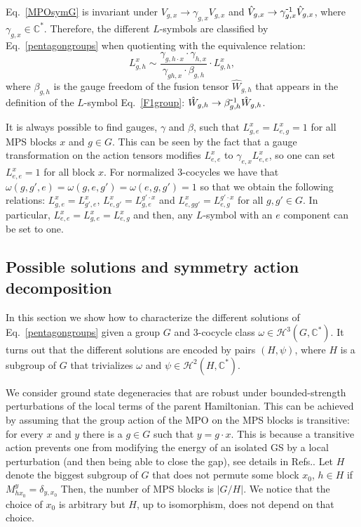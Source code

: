 \documentclass[a4paper,twocolumn,11pt,accepted=2023-02-10]{quantumarticle}
\newcommand{\myinv}[1]{#1^{\scalebox{0.9}[1.0]{-}1}}
\begin{document}
 Eq.\ \eqref{MPOsymG} is invariant under 
 $ V_{g,x} \to  \gamma_{g,x}  V_{g,x}$ and  $\hat{V}_{g,x} \to  \myinv{\gamma}_{g,x} \hat{V}_{g,x}$, where $ \gamma_{g,x}\in \mathbb{C}^*$. Therefore, the different ${L}$-symbols are classified by Eq.\ \eqref{pentagongroups} when quotienting with the equivalence relation:
 \begin{equation}\label{gdgroup}
{L}_{g,h}^{x} \sim  \frac{ \gamma_{g,h{\cdot} x} \cdot \gamma_{h,x} }{\gamma_{gh,x} \cdot \beta_{g,h} } \cdot {L}_{g,h}^{x}, 
 \end{equation}
where ${\beta}_{g,h}$ is the gauge freedom of the fusion tensor $\hat{W}_{g,h}$ that appears in the definition of the ${L}$-symbol Eq.\ \eqref{F1group}:
$\hat{W}_{g,h}\to \myinv{\beta}_{g,h} \hat{W}_{g,h}$. 

It is always possible to find gauges, $\gamma$ and $\beta$, such that ${L}_{g,e}^{x}={L}_{e,g}^{x}=1$ for all MPS blocks $x$ and $g \in G$. This can be seen by the fact that a gauge transformation on the action tensors modifies ${L}_{e,e}^{x}$ to $\gamma_{e,x} {L}_{e,e}^{x}$, so one can set ${L}_{e,e}^{x}=1$ for all block $x$. For normalized 3-cocycles we have that $\omega(g,g',e)= \omega(g,e,g')=\omega(e,g,g')=1$ so that we obtain the following relations: ${L}_{g,e}^{x} = {L}_{g',e}^{x}$, ${L}_{e,g'}^{x} = {L}_{g,e}^{g'{\cdot} x}$ and ${L}_{e,gg'}^{x} = {L}_{e,g}^{g'{\cdot} x}$ for all $g,g'\in G$. In particular, ${L}_{e,e}^{x}={L}_{g,e}^{x}={L}_{e,g}^{x}$ and then, any ${L}$-symbol with an $e$ component can be set to one.


\subsection{Possible solutions and symmetry action decomposition} \label{physym}
%

In this section we show how to characterize the different solutions of Eq.\ \eqref{pentagongroups} given a group $G$ and $3$-cocycle class $\omega \in  \mathcal{H}^3 (G,\mathbb{C}^*)$. It turns out that the different solutions are encoded by pairs $(H,\psi)$, where $H$ is a subgroup of $G$ that trivializes $\omega$ and $\psi \in \mathcal{H}^2(H,\mathbb{C}^*)$. 

We consider ground state degeneracies that are robust under bounded-strength perturbations of the local terms of the parent Hamiltonian. This can be achieved by assuming that the group action of the MPO on the MPS blocks is transitive: for every $x$ and $y$ there is a $g\in G$ such that $y=g {\cdot} x$. This is because a transitive action prevents one from modifying the energy of an isolated GS by a local perturbation (and then being able to close the gap), see details in Refs.\cite{Schuch11,Bravyi11}. Let $H$ denote the biggest subgroup of $G$ that does not permute some block $x_0$, $h\in H$ if $M_{h x_0}^y=\delta_{y,x_0}$ Then, the number of MPS blocks is $|G/H|$.  We notice that the choice of $x_0$ is arbitrary but $H$, up to isomorphism, does not depend on that choice. 
\end{document}

